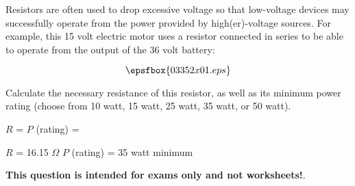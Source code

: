 

Resistors are often used to drop excessive voltage so that low-voltage devices may successfully operate from the power provided by high(er)-voltage sources.  For example, this 15 volt electric motor uses a resistor connected in series to be able to operate from the output of the 36 volt battery:

$$\epsfbox{03352x01.eps}$$

Calculate the necessary resistance of this resistor, as well as its minimum power rating (choose from 10 watt, 15 watt, 25 watt, 35 watt, or 50 watt).

\vskip 10pt

$R$ = \hskip 140pt $P$ (rating) = 







$R$ = 16.15 $\Omega$ \hskip 100pt $P$ (rating) = 35 watt minimum







{\bf This question is intended for exams only and not worksheets!}.



